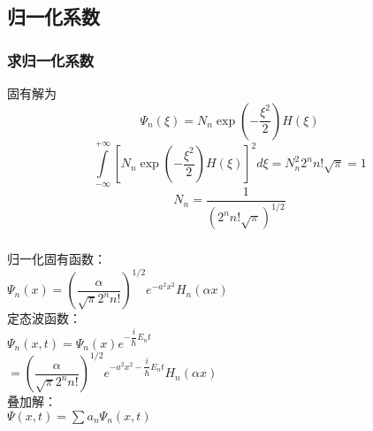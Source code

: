 \subsection{归一化系数}

\begin{frame}
	\frametitle{求归一化系数}
	固有解为
	\begin{equation*}
		\Psi_n(\xi) = N_n \exp(-\frac{\xi ^2}{2}) H(\xi) 
	\end{equation*}   
	\begin{equation*}
		\int\limits_{-\infty}^{+\infty} [N_n \exp(-\frac{\xi ^2}{2}) H(\xi) ]^2d\xi  =N^2 _n 2^n n! \sqrt{\pi}=1
	\end{equation*}  
	\begin{equation*}
    	N_n=\dfrac{1}{(2^n n! \sqrt{\pi}) ^{1/2}}
	\end{equation*}    
\end{frame}	

\begin{frame}
	\frametitle{  }
	归一化固有函数：\\  
	{ $  \displaystyle  \Psi_n(x) =  \left(  \dfrac{\alpha}{\sqrt{\pi} 2^n n! } \right) ^{1/2} e^{-a^2 x^2}  H_n(\alpha x)  $ } \\ 
	定态波函数： \\
	{ $  \displaystyle  \Psi_n(x,t) =  \Psi_n(x) e^{-\dfrac{i}{\hbar} E_n t } $} \\
	{$  \displaystyle = \left(  \dfrac{\alpha }{\sqrt{\pi} 2^n n! } \right) ^{1/2} e^{-a^2 x^2 -\dfrac{i}{\hbar} E_n t }  H_n(\alpha  x)  $ } \\  
	叠加解：\\
	{\large $  \displaystyle \Psi(x,t) =\sum a_n \Psi_n(x,t)  $} \\	
\end{frame}	

